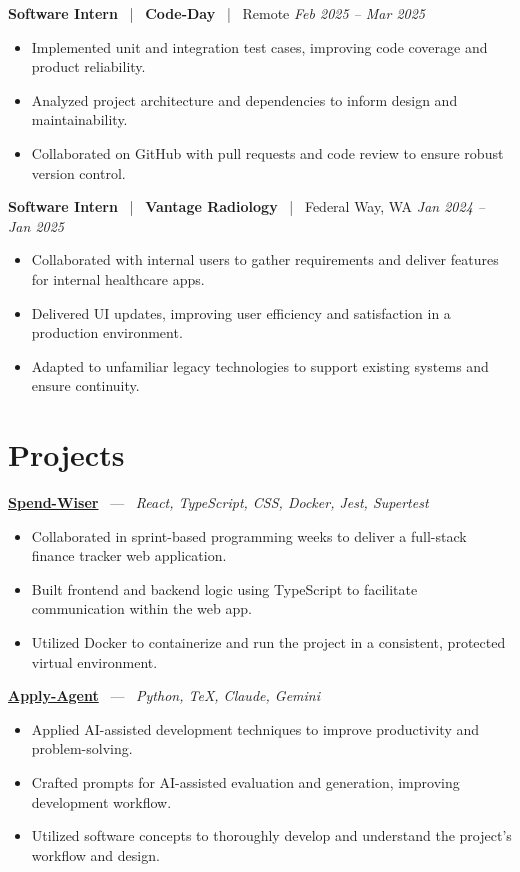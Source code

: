 \documentclass[10pt, letterpaper]{article}
\newcommand{\jobhead}[4]{%
  \vspace{5pt}%
  {\bfseries\color{dark}#1}%
  ~{\color{light}|}~%
  {\bfseries\color{navy}#2}%
  ~{\color{light}|}~%
  {\color{light}#3}%
  \hfill{\color{light}\small\textit{#4}}\\[-2pt]%
}
\newcommand{\projhead}[3]{%
  \vspace{5pt}%
  {\bfseries\color{dark}\href{#2}{#1}}%
  ~{\color{light}---}~%
  {\color{light}\small\textit{#3}}\\[-2pt]%
}
\begin{document}
\jobhead{Software Intern}{Code-Day}{Remote}{Feb 2025 – Mar 2025}
\begin{itemize}
  \item Implemented unit and integration test cases, improving code coverage and product reliability.
  \item Analyzed project architecture and dependencies to inform design and maintainability.
  \item Collaborated on GitHub with pull requests and code review to ensure robust version control.
\end{itemize}

\jobhead{Software Intern}{Vantage Radiology}{Federal Way, WA}{Jan 2024 – Jan 2025}
\begin{itemize}
  \item Collaborated with internal users to gather requirements and deliver features for internal healthcare apps.
  \item Delivered UI updates, improving user efficiency and satisfaction in a production environment.
  \item Adapted to unfamiliar legacy technologies to support existing systems and ensure continuity.
\end{itemize}

\section{Projects}

\projhead{Spend-Wiser}{https://github.com/JesseChum/w26-sdev372-spendwiser-finance-tracker}{React, TypeScript, CSS, Docker, Jest, Supertest}
\begin{itemize}
  \item Collaborated in sprint-based programming weeks to deliver a full-stack finance tracker web application.
  \item Built frontend and backend logic using TypeScript to facilitate communication within the web app.
  \item Utilized Docker to containerize and run the project in a consistent, protected virtual environment.
\end{itemize}

\projhead{Apply-Agent}{https://github.com/timmyd4/apply-agent}{Python, TeX, Claude, Gemini}
\begin{itemize}
  \item Applied AI-assisted development techniques to improve productivity and problem-solving.
  \item Crafted prompts for AI-assisted evaluation and generation, improving development workflow.
  \item Utilized software concepts to thoroughly develop and understand the project's workflow and design.
\end{itemize}
\end{document}
